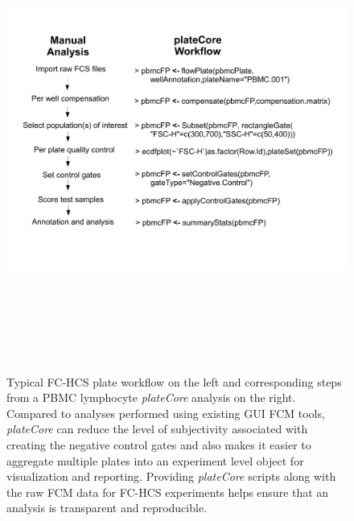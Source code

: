 \documentclass[12pt]{article}
\newcommand{\Rpackage}[1]{{\textit{#1}}}
\begin{document}
\clearpage
\begin{figure}
\centering
\includegraphics[width=7in,height=6in]{analysisSteps.pdf}
\caption{Typical FC-HCS plate workflow on the left and corresponding steps from
a PBMC lymphocyte \Rpackage{plateCore} analysis on the right. Compared to
analyses performed using existing GUI FCM tools, \Rpackage{plateCore} can
reduce the level of subjectivity associated with creating the negative control
gates and also makes it easier to aggregate multiple plates into an experiment
level object for visualization and reporting. Providing \Rpackage{plateCore}
scripts along with the raw FCM data for FC-HCS experiments helps ensure that an
analysis is transparent and reproducible.}
\label{fig:analysis}
\end{figure}
\end{document}

